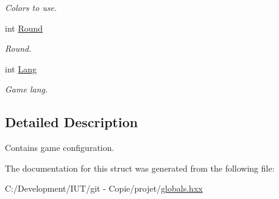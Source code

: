 \begin{DoxyCompactItemize}
\begin{DoxyCompactList}\small\item\em Colors to use. \end{DoxyCompactList}\item 
\hypertarget{struct_chase_game_1_1_s_game_status_a8bef1eae750f52625ca337be30373296}{int \hyperlink{struct_chase_game_1_1_s_game_status_a8bef1eae750f52625ca337be30373296}{Round}}\label{struct_chase_game_1_1_s_game_status_a8bef1eae750f52625ca337be30373296}

\begin{DoxyCompactList}\small\item\em Round. \end{DoxyCompactList}\item 
\hypertarget{struct_chase_game_1_1_s_game_status_a93c5db2ceb07569075406e865949b4d9}{int \hyperlink{struct_chase_game_1_1_s_game_status_a93c5db2ceb07569075406e865949b4d9}{Lang}}\label{struct_chase_game_1_1_s_game_status_a93c5db2ceb07569075406e865949b4d9}

\begin{DoxyCompactList}\small\item\em Game lang. \end{DoxyCompactList}\end{DoxyCompactItemize}


\subsection{Detailed Description}
Contains game configuration. 

The documentation for this struct was generated from the following file\-:\begin{DoxyCompactItemize}
\item 
C\-:/\-Development/\-I\-U\-T/git -\/ Copie/projet/\hyperlink{globals_8hxx}{globals.\-hxx}\end{DoxyCompactItemize}

